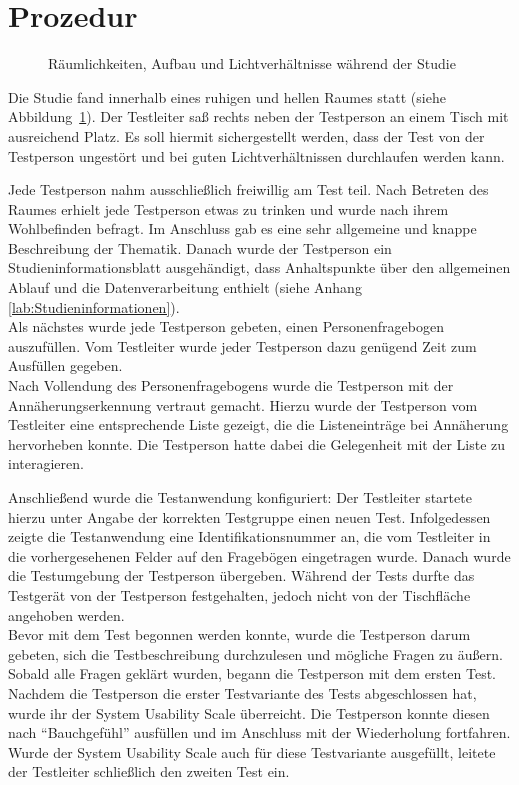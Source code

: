 \documentclass[12pt,numbers=noenddot,parskip,bibliography=totocnumbered,listof=totocnumbered]{scrreprt}
\begin{document}
\section{Prozedur}
\begin{figure}
\centering
{}
\vfill
{}
\vfill
{}
\caption{Räumlichkeiten, Aufbau und Lichtverhältnisse während der Studie}
\label{prozedurumgebung}
\end{figure}
Die Studie fand innerhalb eines ruhigen und hellen Raumes statt (siehe Abbildung~\ref{prozedurumgebung}). Der Testleiter saß rechts neben der Testperson an einem Tisch mit ausreichend Platz. Es soll hiermit sichergestellt werden, dass der Test von der Testperson ungestört und bei guten Lichtverhältnissen durchlaufen werden kann.

Jede Testperson nahm ausschließlich freiwillig am Test teil. Nach Betreten des Raumes erhielt jede Testperson etwas zu trinken und wurde nach ihrem Wohlbefinden befragt. Im Anschluss gab es eine sehr allgemeine und knappe Beschreibung der Thematik. Danach wurde der Testperson ein Studieninformationsblatt ausgehändigt, dass Anhaltspunkte über den allgemeinen Ablauf und die Datenverarbeitung enthielt (siehe Anhang \ref{lab:Studieninformationen}).\\
Als nächstes wurde jede Testperson gebeten, einen Personenfragebogen auszufüllen. Vom Testleiter wurde jeder Testperson dazu genügend Zeit zum Ausfüllen gegeben.\\
Nach Vollendung des Personenfragebogens wurde die Testperson mit der Annäherungserkennung vertraut gemacht. Hierzu wurde der Testperson vom Testleiter eine entsprechende Liste gezeigt, die die Listeneinträge bei Annäherung hervorheben konnte. Die Testperson hatte dabei die Gelegenheit mit der Liste zu interagieren.

Anschließend wurde die Testanwendung konfiguriert: Der Testleiter startete hierzu unter Angabe der korrekten Testgruppe einen neuen Test. Infolgedessen zeigte die Testanwendung eine Identifikationsnummer an, die vom Testleiter in die vorhergesehenen Felder auf den Fragebögen eingetragen wurde. Danach wurde die Testumgebung der Testperson übergeben. Während der Tests durfte das Testgerät von der Testperson festgehalten, jedoch nicht von der Tischfläche angehoben werden.\\
Bevor mit dem Test begonnen werden konnte, wurde die Testperson darum gebeten, sich die Testbeschreibung durchzulesen und mögliche Fragen zu äußern. Sobald alle Fragen geklärt wurden, begann die Testperson mit dem ersten Test.\\
Nachdem die Testperson die erster Testvariante des Tests abgeschlossen hat, wurde ihr der System Usability Scale überreicht. Die Testperson konnte diesen nach "`Bauchgefühl"' ausfüllen und im Anschluss mit der Wiederholung fortfahren. Wurde der System Usability Scale auch für diese Testvariante ausgefüllt, leitete der Testleiter schließlich den zweiten Test ein.
\end{document}
